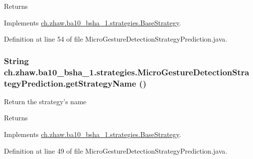\begin{DoxyReturn}{Returns}

\end{DoxyReturn}


Implements \hyperlink{classch_1_1zhaw_1_1ba10__bsha__1_1_1strategies_1_1BaseStrategy_a75fdb36932ad701f6375cc1fe718056b}{ch.zhaw.ba10\_\-bsha\_\-1.strategies.BaseStrategy}.

Definition at line 54 of file MicroGestureDetectionStrategyPrediction.java.\hypertarget{classch_1_1zhaw_1_1ba10__bsha__1_1_1strategies_1_1MicroGestureDetectionStrategyPrediction_a68da2773da59d52a57a8c57b4695fe14}{
\subsubsection[{getStrategyName}]{\setlength{\rightskip}{0pt plus 5cm}String ch.zhaw.ba10\_\-bsha\_\-1.strategies.MicroGestureDetectionStrategyPrediction.getStrategyName ()}}
\label{classch_1_1zhaw_1_1ba10__bsha__1_1_1strategies_1_1MicroGestureDetectionStrategyPrediction_a68da2773da59d52a57a8c57b4695fe14}
Return the strategy's name

\begin{DoxyReturn}{Returns}

\end{DoxyReturn}


Implements \hyperlink{classch_1_1zhaw_1_1ba10__bsha__1_1_1strategies_1_1BaseStrategy_aa0ebed55eed45409bad13d43a0058780}{ch.zhaw.ba10\_\-bsha\_\-1.strategies.BaseStrategy}.

Definition at line 49 of file MicroGestureDetectionStrategyPrediction.java.

